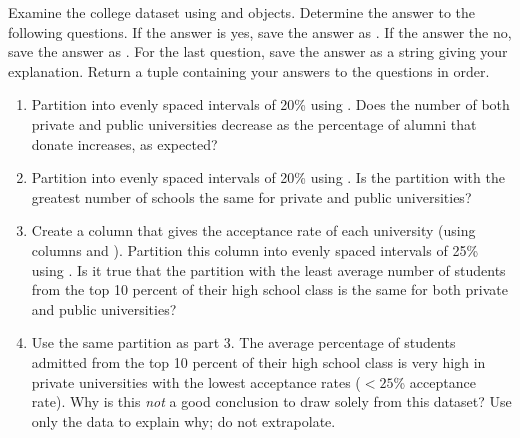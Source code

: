 \begin{problem}
Examine the college dataset using  and  objects.
Determine the answer to the following questions.
If the answer is yes, save the answer as .
If the answer the no, save the answer as .
For the last question, save the answer as a string giving your explanation.
Return a tuple containing your answers to the questions in order.

\begin{enumerate}
\item Partition  into evenly spaced intervals of 20\% using .
Does the number of both private and public universities decrease as the percentage of alumni that donate increases, as expected?

\item Partition  into evenly spaced intervals of 20\% using .
Is the partition with the greatest number of schools the same for private and public universities?

\item Create a column that gives the acceptance rate of each university (using columns  and ).
Partition this column into evenly spaced intervals of 25\% using .
Is it true that the partition with the least average number of students from the top 10 percent of their high school class is the same for both private and public universities?

\item Use the same partition as part 3.
The average percentage of students admitted from the top 10 percent of their high school class is very high in private universities with the lowest acceptance rates ($<25$\% acceptance rate).
Why is this \emph{not} a good conclusion to draw solely from this dataset?
Use only the data to explain why; do not extrapolate.
\end{enumerate}
\end{problem}
